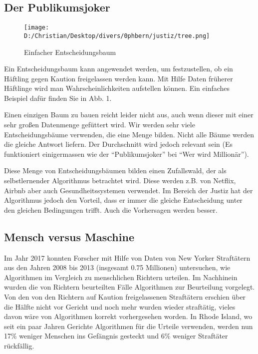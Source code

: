 \documentclass{article}
\begin{document}
\subsection*{Der Publikumsjoker} 

\begin{wrapfigure}{r}{0.6\textwidth}
	\centering
		\texttt{[image: D:/Christian/Desktop/divers/0phbern/justiz/tree.png]}
		\caption{Einfacher Entscheidungsbaum}
\end{wrapfigure}


Ein Entscheidungsbaum kann angewendet werden, um festzustellen, ob ein Häftling gegen Kaution freigelassen werden kann. Mit Hilfe Daten früherer Häftlinge wird man Wahrscheinlichkeiten aufstellen können. Ein einfaches Beispiel dafür finden Sie in Abb.  1. 

Einen einzigen Baum zu bauen reicht leider nicht aus, auch wenn dieser mit einer sehr großen Datenmenge gefüttert wird. Wir werden sehr viele Entscheidungsbäume verwenden, die eine Menge bilden. Nicht alle Bäume werden die gleiche Antwort liefern. Der Durchschnitt wird jedoch relevant sein (Es funktioniert einigermassen wie der “Publikumsjoker” bei “Wer wird Millionär”).  

Diese Menge von Entscheidungsbäumen bilden einen Zufallswald, der als selbstlernender Algorithmus betrachtet wird. Diese werden z.B. von Netflix, Airbnb aber auch Gesundheitssystemen verwendet. Im Bereich der Justiz hat der Algorithmus jedoch den Vorteil, dass er immer die gleiche Entscheidung unter den gleichen Bedingungen trifft. Auch die Vorhersagen werden besser. 

\subsection*{Mensch versus Maschine} 

Im Jahr 2017 konnten Forscher mit Hilfe von Daten von New Yorker Straftätern aus den Jahren 2008 bis 2013 (insgesamt 0.75 Millionen) untersuchen, wie Algorithmen im Vergleich zu menschlichen Richtern urteilen. Im Nachhinein wurden die von Richtern beurteilten Fälle Algorithmen zur Beurteilung vorgelegt. Von den von den Richtern auf Kaution freigelassenen Straftätern erschien über die Hälfte nicht vor Gericht und noch mehr wurden wieder straftätig, vieles davon wäre von Algorithmen korrekt vorhergesehen worden. In Rhode Island, wo seit ein paar Jahren Gerichte Algorithmen für die Urteile verwenden, werden nun 17\% weniger Menschen ins Gefängnis gesteckt und 6\% weniger Straftäter rückfällig. 
\end{document}
